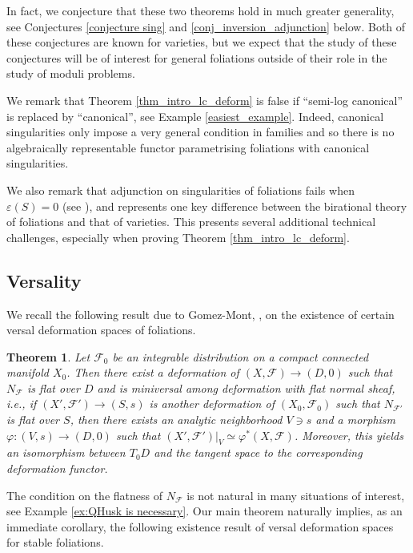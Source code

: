 \documentclass[12pt, a4paper]{amsart}
\newcommand\FF{\mathcal{F}}
\newcounter{Theorem}
\newtheorem{theorem}{Theorem}[section]
\theoremstyle{definition}
\theoremstyle{named}
\begin{document}
In fact, we conjecture that these two theorems hold in much greater generality, see Conjectures \ref{conjecture sing} and \ref{conj_inversion_adjunction} below.  Both of these conjectures are known for varieties, but we expect that the study of these conjectures will be of interest for general foliations outside of their role in the study of moduli problems. 

We remark that Theorem \ref{thm_intro_lc_deform} is false if ``semi-log canonical'' is replaced by ``canonical'', see Example \ref{easiest_example}.  Indeed, canonical singularities only impose a very general condition in families and so there is no algebraically representable functor parametrising foliations with canonical singularities.

We also remark that adjunction on singularities of foliations fails when $\varepsilon(S) = 0$ (see \cite[Example 3.20]{CS23b}), and represents one key difference between the birational theory of foliations and that of varieties.  This presents several additional technical challenges, especially when proving Theorem \ref{thm_intro_lc_deform}.

\subsection{Versality}
We recall the following result due to Gomez-Mont, \cite[Theorem 3.4]{gomez1988transverse}, on the existence of certain versal deformation spaces of foliations.


\begin{theorem} Let $\FF_0$ be an integrable distribution on a compact connected manifold $X_0$. Then there exist a deformation of $(X,\FF)\to (D,0)$ such that $N_\FF$ is flat over $D$ and is miniversal among deformation with flat normal sheaf, i.e., if $(X',\FF')\to (S,s)$ is another deformation of $(X_0,\FF_0)$ such that $N_{\mathcal F'}$ is flat over $S$, then there exists an analytic neighborhood $V\ni s$ and a morphism $\varphi:(V,s)\to (D,0)$ such that $(X',\FF')\vert_V\simeq \varphi^*(X,\FF)$. Moreover, this yields an isomorphism between $T_0D$ and the tangent space to the corresponding deformation functor.
\end{theorem}

The condition on the flatness of $N_{\mathcal F}$ is not natural in many situations of interest, see Example \ref{ex:QHusk is necessary}. 
Our main theorem naturally implies, as an immediate corollary, the following existence result of versal deformation spaces for stable foliations.
\end{document}
